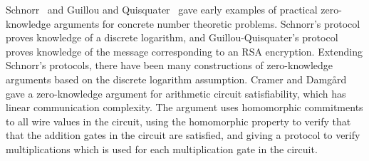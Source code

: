 %
%
%
%
%
%

Schnorr~\cite{Schnorr91} and Guillou and Quisquater~\cite{GQ88} gave early examples of practical zero-knowledge arguments for concrete number theoretic problems. Schnorr's protocol proves knowledge of a discrete logarithm, and Guillou-Quisquater's protocol proves knowledge of the message corresponding to an RSA encryption. Extending Schnorr's protocols, there have been many constructions of zero-knowledge arguments based on the discrete logarithm assumption. Cramer and Damg{\aa}rd~\cite{Cramer1998a} gave a zero-knowledge argument for arithmetic circuit satisfiability, which has linear communication complexity. The argument uses homomorphic commitments to all wire values in the circuit, using the homomorphic property to verify that that the addition gates in the circuit are satisfied, and giving a protocol to verify multiplications which is used for each multiplication gate in the circuit.

